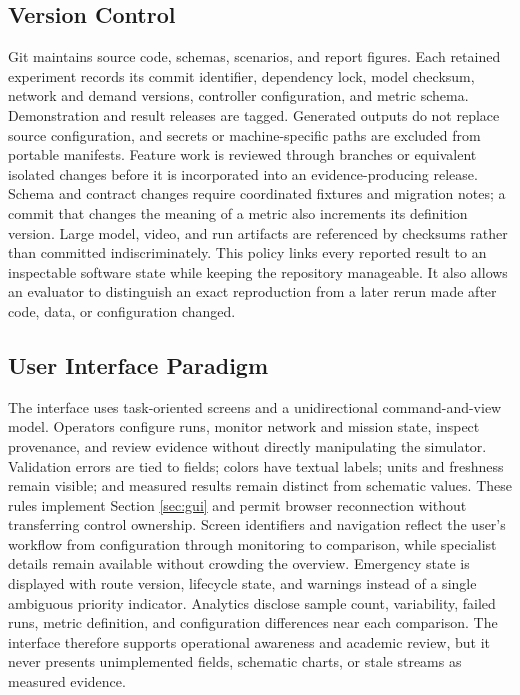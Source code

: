 \subsection{Version Control}

Git maintains source code, schemas, scenarios, and report figures. Each retained experiment records its commit identifier, dependency lock, model checksum, network and demand versions, controller configuration, and metric schema. Demonstration and result releases are tagged. Generated outputs do not replace source configuration, and secrets or machine-specific paths are excluded from portable manifests. Feature work is reviewed through branches or equivalent isolated changes before it is incorporated into an evidence-producing release. Schema and contract changes require coordinated fixtures and migration notes; a commit that changes the meaning of a metric also increments its definition version. Large model, video, and run artifacts are referenced by checksums rather than committed indiscriminately. This policy links every reported result to an inspectable software state while keeping the repository manageable. It also allows an evaluator to distinguish an exact reproduction from a later rerun made after code, data, or configuration changed.

\subsection{User Interface Paradigm}

The interface uses task-oriented screens and a unidirectional command-and-view model. Operators configure runs, monitor network and mission state, inspect provenance, and review evidence without directly manipulating the simulator. Validation errors are tied to fields; colors have textual labels; units and freshness remain visible; and measured results remain distinct from schematic values. These rules implement Section \ref{sec:gui} and permit browser reconnection without transferring control ownership. Screen identifiers and navigation reflect the user's workflow from configuration through monitoring to comparison, while specialist details remain available without crowding the overview. Emergency state is displayed with route version, lifecycle state, and warnings instead of a single ambiguous priority indicator. Analytics disclose sample count, variability, failed runs, metric definition, and configuration differences near each comparison. The interface therefore supports operational awareness and academic review, but it never presents unimplemented fields, schematic charts, or stale streams as measured evidence.

